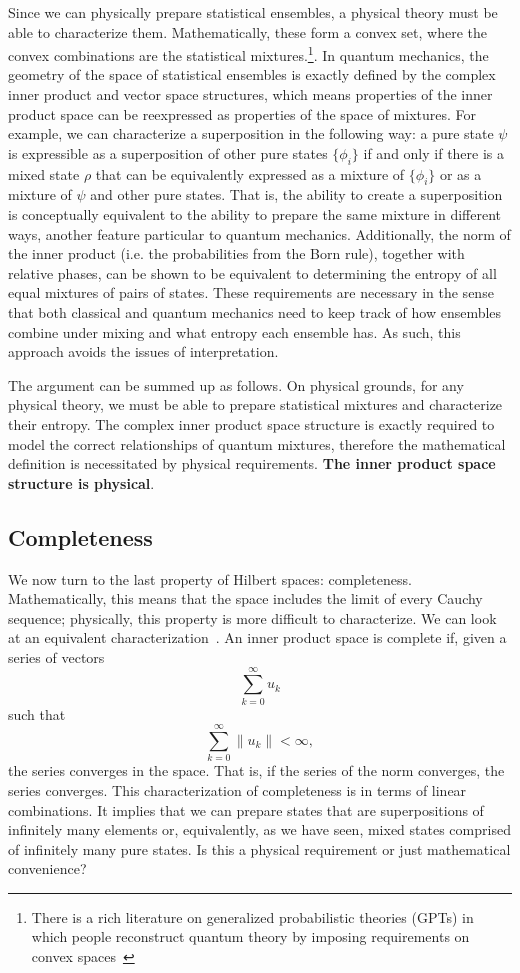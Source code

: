 \documentclass[10pt,twocolumn, nofootinbib]{revtex4-2}
\begin{document}
Since we can physically prepare statistical ensembles, a physical theory must be able to characterize them. Mathematically, these form a convex set, where the convex combinations are the statistical mixtures.\footnote{There is a rich literature on generalized probabilistic theories (GPTs) in which people reconstruct quantum theory by imposing requirements on convex spaces~\cite{gpt_overview_2021}}. In quantum mechanics, the geometry of the space of statistical ensembles is exactly defined by the complex inner product and vector space structures, which means properties of the inner product space can be reexpressed as properties of the space of mixtures. For example, we can characterize a superposition in the following way: a pure state $\psi$ is expressible as a superposition of other pure states $\{\phi_i\}$ if and only if there is a mixed state $\rho$ that can be equivalently expressed as a mixture of $\{\phi_i\}$ or as a mixture of $\psi$ and other pure states. That is, the ability to create a superposition is conceptually equivalent to the ability to prepare the same mixture in different ways, another feature particular to quantum mechanics. Additionally, the norm of the inner product (i.e. the probabilities from the Born rule), together with relative phases, can be shown to be equivalent to determining the entropy of all equal mixtures of pairs of states. These requirements are necessary in the sense that both classical and quantum mechanics need to keep track of how ensembles combine under mixing and what entropy each ensemble has. As such, this approach avoids the issues of interpretation.

The argument can be summed up as follows. On physical grounds, for any physical theory, we must be able to prepare statistical mixtures and characterize their entropy. The complex inner product space structure is exactly required to model the correct relationships of quantum mixtures, therefore the mathematical definition is necessitated by physical requirements. \textbf{The inner product space structure is physical}.

\subsection{Completeness}

We now turn to the last property of Hilbert spaces: completeness. Mathematically, this means that the space includes the limit of every Cauchy sequence; physically, this property is more difficult to characterize. We can look at an equivalent characterization~\cite[Theorem 13.8]{roman_2008}. An inner product space is complete if, given a series of vectors
$$ \sum _{k=0}^{\infty }u_{k}$$
such that
$$ \sum _{k=0}^{\infty }\|u_{k}\|<\infty,$$
the series converges in the space. That is, if the series of the norm converges, the series converges. This characterization of completeness is in terms of linear combinations. It implies that we can prepare states that are superpositions of infinitely many elements or, equivalently, as we have seen, mixed states comprised of infinitely many pure states. Is this a physical requirement or just mathematical convenience?
\end{document}
